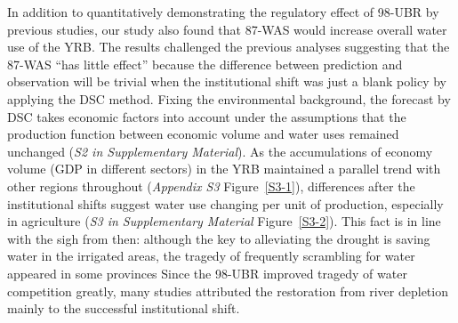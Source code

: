 
\label{discussion-1}
In addition to quantitatively demonstrating the regulatory effect of 98-UBR by previous studies, our study also found that 87-WAS would increase overall water use of the YRB.
The results challenged the previous analyses suggesting that the 87-WAS ``has little effect'' because the difference between prediction and observation will be trivial when the institutional shift was just a blank policy by applying the DSC method. %
Fixing the environmental background, the forecast by DSC takes economic factors into account under the assumptions that the production function between economic volume and water uses remained unchanged (\textit{S2 in Supplementary Material}).
As the accumulations of economy volume (GDP in different sectors) in the YRB maintained a parallel trend with other regions throughout (\textit{Appendix S3} Figure~\ref{S3-1}), differences after the institutional shifts suggest water use changing per unit of production, especially in agriculture (\textit{S3 in Supplementary Material} Figure~\ref{S3-2}).
This fact is in line with the sigh from then: although the key to alleviating the drought is saving water in the irrigated areas, the tragedy of frequently scrambling for water appeared in some provinces %
Since the 98-UBR improved tragedy of water competition greatly, many studies attributed the restoration from river depletion mainly to the successful institutional shift.

